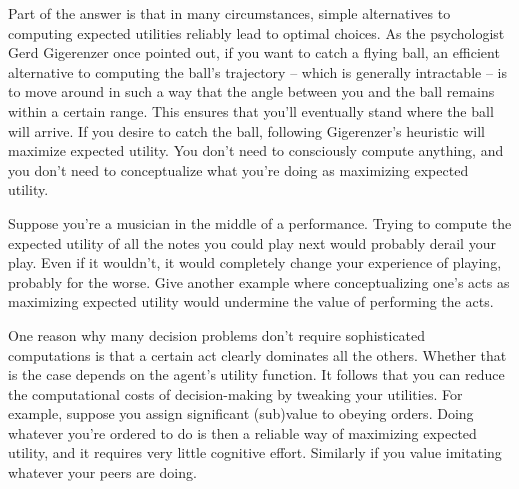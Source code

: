 Part of the answer is that in many circumstances, simple alternatives
to computing expected utilities reliably lead to optimal choices. As
the psychologist Gerd Gigerenzer once pointed out, if you want to
catch a flying ball, an efficient alternative to computing the ball's
trajectory -- which is generally intractable -- is to move around in
such a way that the angle between you and the ball remains within a
certain range. This ensures that you'll eventually stand where the
ball will arrive. If you desire to catch the ball, following
Gigerenzer's heuristic will maximize expected utility. You don't need
to consciously compute anything, and you don't need to conceptualize
what you're doing as maximizing expected utility.

\begin{exercise}{1}
  Suppose you're a musician in the middle of a performance. Trying to
  compute the expected utility of all the notes you could play next
  would probably derail your play. Even if it wouldn't, it would
  completely change your experience of playing, probably for the
  worse. Give another example where conceptualizing one's acts as
  maximizing expected utility would undermine the value of performing
  the acts. 
\end{exercise}

One reason why many decision problems don't require sophisticated
computations is that a certain act clearly dominates all the others.
Whether that is the case depends on the agent's utility function. It
follows that you can reduce the computational costs of decision-making
by tweaking your utilities. For example, suppose you assign
significant (sub)value to obeying orders. Doing whatever you're
ordered to do is then a reliable way of maximizing expected utility,
and it requires very little cognitive effort. Similarly if you value
imitating whatever your peers are doing.


